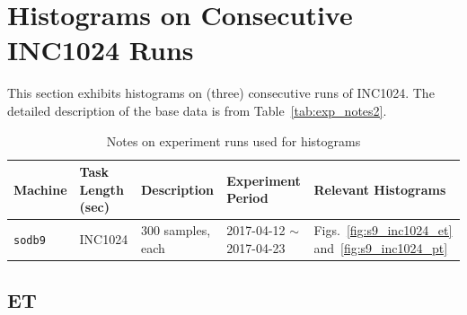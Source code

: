 \clearpage

\section{Histograms on Consecutive INC1024 Runs~\label{sec:s9_1024_runs}} 
This section exhibits histograms on (three) consecutive runs of INC1024. 
The detailed description of the base data is from Table~\ref{tab:exp_notes2}.

\begin{table}[h]
\begin{center}
\begin{tabular}{|p{2cm}|p{3cm}|p{3cm}|p{4cm}|p{3.5cm}|} \hline
Machine & Task Length (sec) & Description & Experiment Period & Relevant \linebreak Histograms\\ \hline
{\tt sodb9} &  INC1024 & 300 samples, each & 2017-04-12 $\sim$ 2017-04-23 & 
Figs.~\ref{fig:s9_inc1024_et} and~\ref{fig:s9_inc1024_pt}\\ \hline
\end{tabular}
\end{center}
\vspace{-.2in}
\caption{Notes on experiment runs used for histograms\label{tab:inc1024_run_notes}}
\end{table}

\clearpage
\newpage

\subsection{ET}

